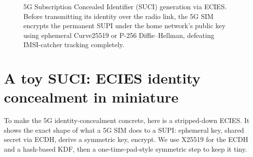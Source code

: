 \begin{figure}[H]
\caption{5G Subscription Concealed Identifier (SUCI) generation via ECIES. Before transmitting its identity
over the radio link, the 5G SIM encrypts the permanent SUPI under the home network's public key using
ephemeral Curve25519 or P-256 Diffie--Hellman, defeating IMSI-catcher tracking completely.}
\label{ch29:fig-suci}
\end{figure}

\section{A toy SUCI: ECIES identity concealment in miniature}
\label{ch29:toy-suci}

To make the 5G identity-concealment concrete, here is a stripped-down ECIES. It shows the exact shape of what a 5G SIM does to a SUPI: ephemeral key, shared secret via ECDH, derive a symmetric key, encrypt. We use X25519 for the ECDH and a hash-based KDF, then a one-time-pad-style symmetric step to keep it tiny.

